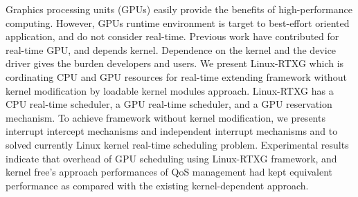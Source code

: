 Graphics processing units (GPUs) easily provide the benefits of high-performance computing.
However, GPUs runtime environment is target to best-effort oriented application, and do not consider real-time.
Previous work have contributed for real-time GPU, and depends kernel.
Dependence on the kernel and the device driver gives the burden developers and users.
We present Linux-RTXG which is cordinating CPU and GPU resources for real-time extending framework without kernel modification by loadable kernel modules approach. 
Linux-RTXG has a CPU real-time scheduler, a GPU real-time scheduler, and a GPU reservation mechanism.
To achieve framework without kernel modification, 
we presents interrupt intercept mechanisms and independent interrupt mechanisms and to solved currently Linux kernel real-time scheduling problem.
Experimental results indicate that overhead of GPU scheduling using Linux-RTXG framework,
and kernel free's approach performances of QoS management had kept equivalent performance as compared with the existing kernel-dependent approach.

